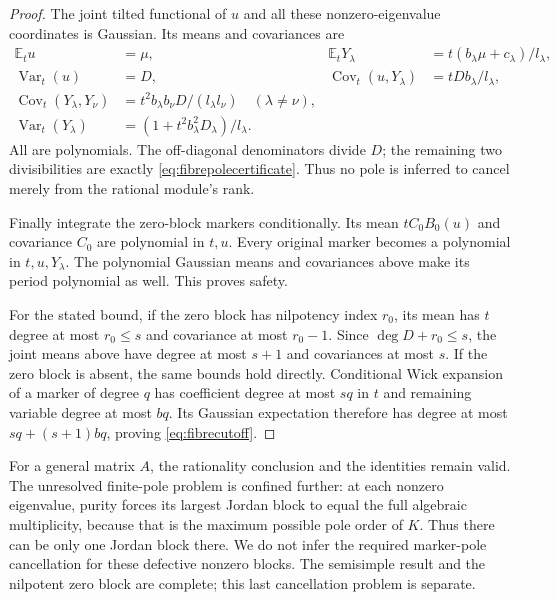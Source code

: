 \documentclass[11pt]{article}
\theoremstyle{definition}\newtheorem{definition}[theorem]{Definition}
\theoremstyle{remark}\newtheorem{remark}[theorem]{Remark}
\newcommand{\E}{\mathbb E}
\begin{document}
\begin{proof}
The joint tilted functional of $u$ and all these nonzero-eigenvalue
coordinates is Gaussian. Its means and covariances are
\begin{align*}
 \E_tu&=\mu,&\E_tY_\lambda
   &=t(b_\lambda\mu+c_\lambda)/l_\lambda,\\
 \operatorname{Var}_t(u)&=D,&
 \operatorname{Cov}_t(u,Y_\lambda)&=tDb_\lambda/l_\lambda,\\
 \operatorname{Cov}_t(Y_\lambda,Y_\nu)
   &=t^2b_\lambda b_\nu D/(l_\lambda l_\nu)\quad(\lambda\ne\nu),&&\\
 \operatorname{Var}_t(Y_\lambda)
   &=(1+t^2b_\lambda^2D_\lambda)/l_\lambda.&&
\end{align*}
All are polynomials. The off-diagonal denominators divide $D$;
the remaining two divisibilities are exactly
\eqref{eq:fibrepolecertificate}. Thus no pole is inferred to
cancel merely from the rational module's rank.

Finally integrate the zero-block markers conditionally. Its
mean $tC_0B_0(u)$ and covariance $C_0$ are polynomial in $t,u$.
Every original marker becomes a polynomial in $t,u,Y_\lambda$.
The polynomial Gaussian means and covariances above make its
period polynomial as well. This proves safety.

For the stated bound, if the zero block has nilpotency index
$r_0$, its mean has $t$ degree at most $r_0\le s$ and covariance
at most $r_0-1$. Since $\deg D+r_0\le s$, the joint means
above have degree at most $s+1$ and covariances at most $s$.
If the zero block is absent, the same bounds hold directly.
Conditional Wick expansion of a marker of degree $q$ has
coefficient degree at most $sq$ in $t$ and remaining variable
degree at most $bq$. Its Gaussian expectation therefore has
degree at most $sq+(s+1)bq$, proving
\eqref{eq:fibrecutoff}.
\end{proof}

For a general matrix $A$, the rationality conclusion and the
identities remain valid. The unresolved finite-pole problem is
confined further: at each nonzero eigenvalue, purity forces its
largest Jordan block to equal the full algebraic multiplicity,
because that is the maximum possible pole order of $K$.
Thus there can be only one Jordan block there. We do not infer
the required marker-pole cancellation for these defective
nonzero blocks. The semisimple result and the nilpotent zero
block are complete; this last cancellation problem is separate.
\end{document}
